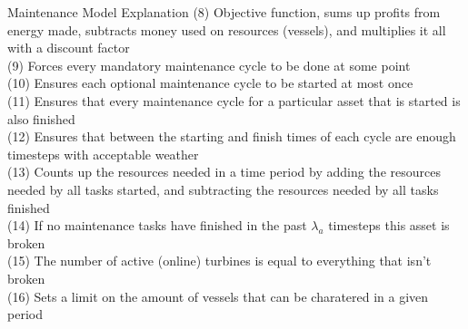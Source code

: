\documentclass{beamer}
\begin{document}
\begin{frame}{Maintenance  Model Explanation}
\footnotesize
(8) Objective function, sums up profits from energy made, subtracts money used on resources (vessels), and multiplies it all with a discount factor	\\
(9) Forces every mandatory maintenance cycle to be done at some point	\\
(10) Ensures each optional maintenance cycle to be started at most once	\\
(11) Ensures that every maintenance cycle for a particular asset that is started is also finished	\\
(12) Ensures that between the starting and finish times of each cycle are enough timesteps with acceptable weather	\\
(13) Counts up the resources needed in a time period by adding the resources needed by all tasks started, and subtracting the resources needed by all tasks finished	\\
(14) If no maintenance tasks have finished in the past $\lambda_a$ timesteps this asset is broken	\\
(15) The number of active (online) turbines is equal to everything that isn't broken \\
(16) Sets a limit on the amount of vessels that can be charatered in a given period
\end{frame}
\end{document}
